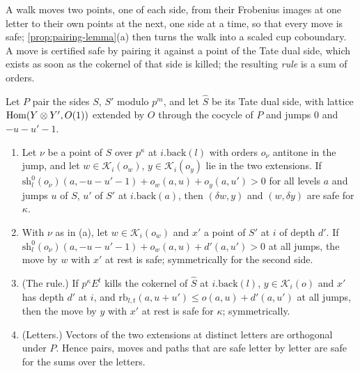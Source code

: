
A walk moves two points, one of each side, from their Frobenius images at one letter to their own points at the next, one side at a time, so that every move is safe; \cref{prop:pairing-lemma}(a) then turns the walk into a scaled cup coboundary. A move is
certified safe by pairing it against a point of the Tate dual side, which exists as soon as the cokernel of that side is killed; the resulting \emph{rule} is a sum of orders.

\begin{lemma}\label{lem:rule}
Let $P$ pair the sides $S$, $S'$ modulo $p^m$, and let $\hat S$ be its Tate dual side, with lattice $\operatorname{Hom}(Y\otimes Y',O(1))$ extended by $O$ through the cocycle of $P$ and jumps $0$ and $-u-u'-1$.
\begin{enumerate}[label=\textup{(\alph*)}]
\item Let $\nu$ be a point of $\hat S$ over $p^\kappa$ at $i.\mathrm{back}(l)$ with orders $o_\nu$ antitone in the jump, and let $w\in\mathcal K_i(o_w)$, $y\in\mathcal K_i(o_y)$ lie in the two extensions. If $\mathrm{sh}^0_l(o_\nu)(a,-u-u'-1)+o_w(a,u)+o_y(a,u')>0$ for all levels $a$ and jumps $u$ of $S$,
$u'$ of $S'$ at $i.\mathrm{back}(a)$, then $(\delta w,y)$ and $(w,\delta y)$ are safe for $\kappa$.
\item With $\nu$ as in (a), let $w\in\mathcal K_i(o_w)$ and $x'$ a point of $S'$ at $i$ of depth $d'$. If $\mathrm{sh}^0_l(o_\nu)(a,-u-u'-1)+o_w(a,u)+d'(a,u')>0$ at all jumps, the move by $w$ with $x'$ at rest is safe; symmetrically for the second side.
\item (The rule.) If $p^\kappa E^t$ kills the cokernel of $\hat S$ at $i.\mathrm{back}(l)$, $y\in\mathcal K_i(o)$ and $x'$ has depth $d'$ at $i$, and $\mathrm{rb}_{l,t}(a,u+u')\le o(a,u)+d'(a,u')$ at all jumps, then the move by $y$ with $x'$ at rest is safe for $\kappa$; symmetrically.
\item (Letters.) Vectors of the two extensions at distinct letters are orthogonal under $P$. Hence pairs, moves and paths that are safe letter by letter are safe for the sums over the letters.
\end{enumerate}
\end{lemma}

